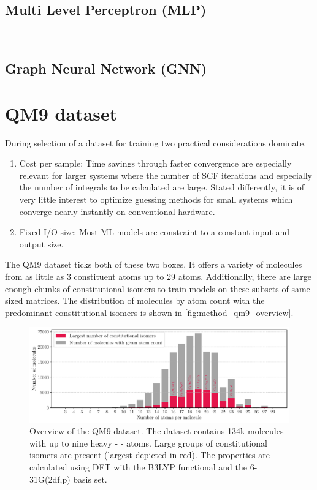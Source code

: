 \subsection{Multi Level Perceptron (MLP)}
\label{subsec:background_mlp}
\\

\subsection{Graph Neural Network (GNN)}
\label{subsec:background_gnn}


\section{QM9 dataset \parencite{ref:data_qm9}}
\label{sec:qm9}
During selection of a dataset for training two practical considerations dominate. 
\begin{enumerate}
    \item Cost per sample: Time savings through faster convergence are especially relevant for larger systems where the number of SCF iterations and especially the number of integrals to be calculated are large. Stated differently, it is of very little interest to optimize guessing methods for small systems which converge nearly instantly on conventional hardware. 
    \item Fixed I/O size: Most ML models are constraint to a constant input and output size. 
\end{enumerate}
The QM9 dataset \parencite{ref:article1_qm9,ref:article2_qm9} ticks both of these two boxes. It offers a variety of molecules from as little as 3 constituent atoms up to 29 atoms. Additionally, there are large enough chunks of constitutional isomers to train models on these subsets of same sized matrices. The distribution of molecules by atom count with the predominant constitutional isomers is shown in \autoref{fig:method_qm9_overview}.
\begin{figure}[H]
    \centering
    \includegraphics[width=\textwidth]{../fig/qm9_general/qm9_overview_stacked_bar.pdf}
    \caption[QM9 dataset overview]{Overview of the QM9 dataset. The dataset contains 134k molecules with up to nine heavy -     - atoms. Large groups of constitutional isomers are present (largest depicted in red). The properties are calculated using DFT with the B3LYP functional and the 6-31G(2df,p) basis set.}
    \label{fig:method_qm9_overview}
\end{figure}
